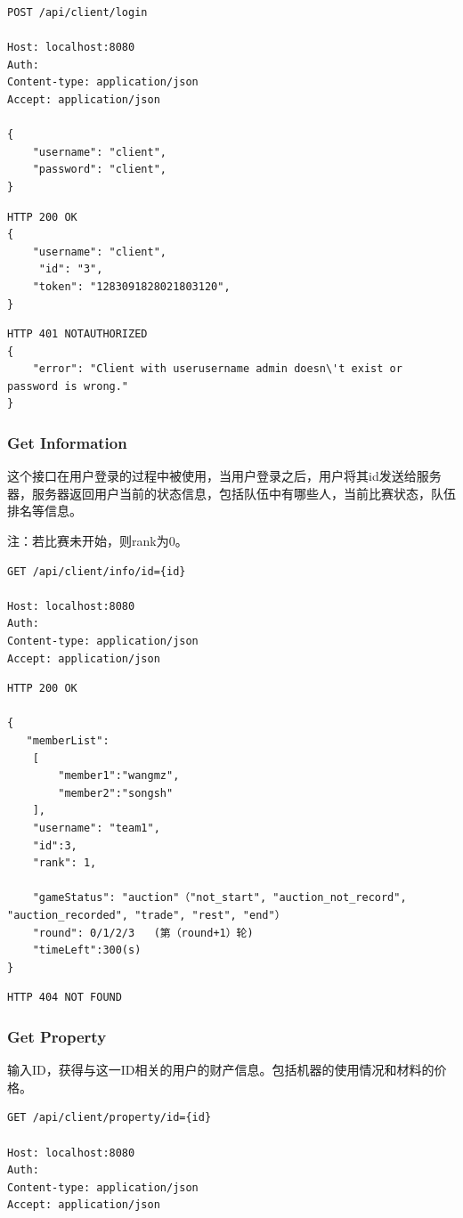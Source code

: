 \documentclass[12pt, a4paper,UTF8]{article}
\begin{document}
\begin{lstlisting}
POST /api/client/login

Host: localhost:8080
Auth:
Content-type: application/json
Accept: application/json

{
    "username": "client",
    "password": "client",
}
\end{lstlisting}

\begin{lstlisting}
HTTP 200 OK
{
    "username": "client",
     "id": "3",
    "token": "1283091828021803120",
}

\end{lstlisting}

\begin{lstlisting}
HTTP 401 NOTAUTHORIZED
{
    "error": "Client with userusername admin doesn\'t exist or password is wrong."
}
\end{lstlisting}

			\subsubsection{Get Information}
				这个接口在用户登录的过程中被使用，当用户登录之后，用户将其id发送给服务器，服务器返回用户当前的状态信息，包括队伍中有哪些人，当前比赛状态，队伍排名等信息。

				注：若比赛未开始，则rank为0。

\begin{lstlisting}
GET /api/client/info/id={id}

Host: localhost:8080
Auth:
Content-type: application/json
Accept: application/json
\end{lstlisting}
\begin{lstlisting}
HTTP 200 OK

{
   "memberList":
    [
        "member1":"wangmz",
    	"member2":"songsh"
    ],
    "username": "team1",
    "id":3,
    "rank": 1,
    
    "gameStatus": "auction"（"not_start", "auction_not_record", "auction_recorded", "trade", "rest", "end"）
    "round": 0/1/2/3   (第（round+1）轮)
    "timeLeft":300(s)
}
\end{lstlisting}
\begin{lstlisting}
HTTP 404 NOT FOUND
\end{lstlisting}

			\subsubsection{Get Property}
				输入ID，获得与这一ID相关的用户的财产信息。包括机器的使用情况和材料的价格。
\begin{lstlisting}
GET /api/client/property/id={id}

Host: localhost:8080
Auth:
Content-type: application/json
Accept: application/json
\end{lstlisting}
\end{document}
